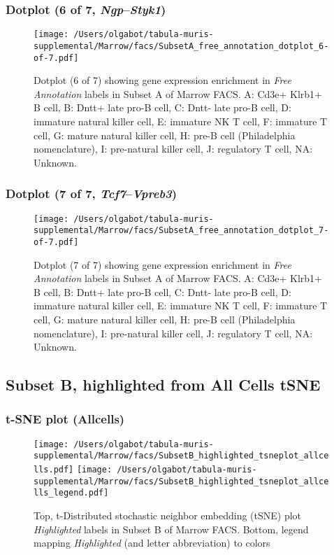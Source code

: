 \clearpage

\subsubsection{Dotplot (6 of 7, \emph{Ngp}--\emph{Styk1})}
\begin{figure}[h]
\centering
\texttt{[image: /Users/olgabot/tabula-muris-supplemental/Marrow/facs/SubsetA\_free\_annotation\_dotplot\_6-of-7.pdf]}

\caption{ Dotplot (6 of 7)  showing gene expression enrichment in \emph{Free Annotation} labels in Subset A of Marrow FACS. A: Cd3e+ Klrb1+ B cell, B: Dntt+ late pro-B cell, C: Dntt- late pro-B cell, D: immature natural killer cell, E: immature NK T cell, F: immature T cell, G: mature natural killer cell, H: pre-B cell (Philadelphia nomenclature), I: pre-natural killer cell, J: regulatory T cell, NA: Unknown.}
\end{figure}


\clearpage

\subsubsection{Dotplot (7 of 7, \emph{Tcf7}--\emph{Vpreb3})}
\begin{figure}[h]
\centering
\texttt{[image: /Users/olgabot/tabula-muris-supplemental/Marrow/facs/SubsetA\_free\_annotation\_dotplot\_7-of-7.pdf]}

\caption{ Dotplot (7 of 7)  showing gene expression enrichment in \emph{Free Annotation} labels in Subset A of Marrow FACS. A: Cd3e+ Klrb1+ B cell, B: Dntt+ late pro-B cell, C: Dntt- late pro-B cell, D: immature natural killer cell, E: immature NK T cell, F: immature T cell, G: mature natural killer cell, H: pre-B cell (Philadelphia nomenclature), I: pre-natural killer cell, J: regulatory T cell, NA: Unknown.}
\end{figure}


\clearpage
\subsection{Subset B, highlighted from All Cells tSNE}
\subsubsection{t-SNE plot (Allcells)}
\begin{figure}[h]
\centering
\texttt{[image: /Users/olgabot/tabula-muris-supplemental/Marrow/facs/SubsetB\_highlighted\_tsneplot\_allcells.pdf]}
\texttt{[image: /Users/olgabot/tabula-muris-supplemental/Marrow/facs/SubsetB\_highlighted\_tsneplot\_allcells\_legend.pdf]}
\caption{Top, t-Distributed stochastic neighbor embedding (tSNE) plot  \emph{Highlighted} labels in Subset B of Marrow FACS. Bottom, legend mapping \emph{Highlighted} (and letter abbreviation) to colors}
\end{figure}


